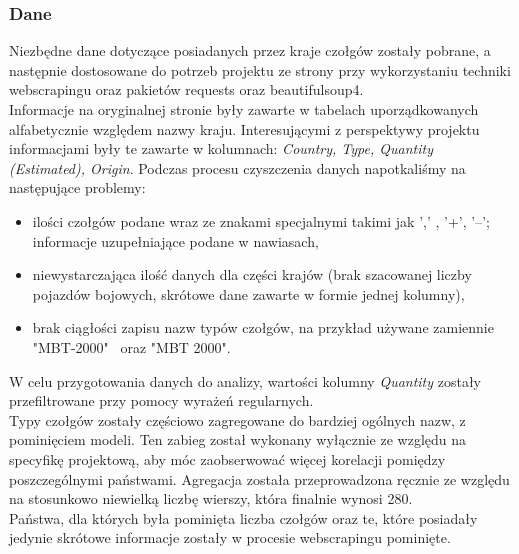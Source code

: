 \subsubsection{Dane}
Niezbędne dane dotyczące posiadanych przez kraje czołgów zostały pobrane, a następnie dostosowane do potrzeb projektu ze strony\cite{dcp19} przy wykorzystaniu techniki webscrapingu oraz pakietów requests oraz beautifulsoup4. \\
Informacje na oryginalnej stronie były zawarte w tabelach uporządkowanych alfabetycznie względem nazwy kraju. Interesującymi z perspektywy projektu informacjami były te zawarte w kolumnach: \textit{Country, Type, Quantity (Estimated), Origin}. Podczas procesu czyszczenia danych napotkaliśmy na następujące problemy:
\begin{itemize}
    \item ilości czołgów podane wraz ze znakami specjalnymi takimi jak ',' , '+', '–'; informacje uzupełniające podane w nawiasach,
    \item niewystarczająca ilość danych dla części krajów (brak szacowanej liczby pojazdów bojowych, skrótowe dane zawarte w formie jednej kolumny),
    \item brak ciągłości zapisu nazw typów czołgów, na przykład używane zamiennie "MBT-2000" \ oraz "MBT 2000". \\
\end{itemize}
\indent W celu przygotowania danych do analizy, wartości kolumny \textit{Quantity} zostały przefiltrowane przy pomocy wyrażeń regularnych.\\
Typy czołgów zostały częściowo zagregowane do bardziej ogólnych nazw, z pominięciem modeli. Ten zabieg został wykonany wyłącznie ze względu na specyfikę projektową, aby móc zaobserwować więcej korelacji pomiędzy poszczególnymi państwami. Agregacja została przeprowadzona ręcznie ze względu na stosunkowo niewielką liczbę wierszy, która finalnie wynosi 280. \\
Państwa, dla których była pominięta liczba czołgów oraz te, które posiadały jedynie skrótowe informacje zostały w procesie webscrapingu pominięte.\\
